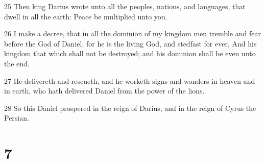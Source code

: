 \par 25 Then king Darius wrote unto all the peoples, nations, and languages, that dwell in all the earth: Peace be multiplied unto you.
\par 26 I make a decree, that in all the dominion of my kingdom men tremble and fear before the God of Daniel; for he is the living God, and stedfast for ever, And his kingdom that which shall not be destroyed; and his dominion shall be even unto the end.
\par 27 He delivereth and rescueth, and he worketh signs and wonders in heaven and in earth, who hath delivered Daniel from the power of the lions.
\par 28 So this Daniel prospered in the reign of Darius, and in the reign of Cyrus the Persian.

\chapter{7}

